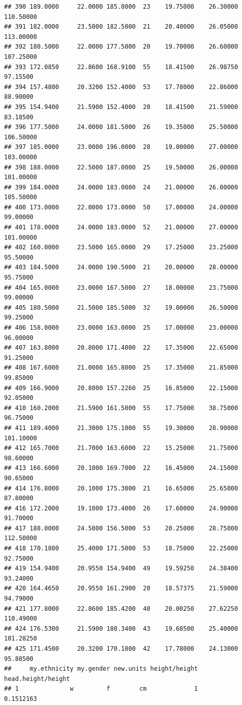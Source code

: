 \documentclass[]{article}
\begin{document}
\begin{verbatim}
## 390 189.0000     22.0000 185.8000  23    19.75000    26.30000 110.50000
## 391 182.0000     23.5000 182.5000  21    20.40000    26.05000 113.00000
## 392 180.5000     22.0000 177.5000  20    19.70000    26.60000 107.25000
## 393 172.0850     22.8600 168.9100  55    18.41500    26.98750  97.15500
## 394 157.4800     20.3200 152.4000  53    17.78000    22.86000  88.90000
## 395 154.9400     21.5900 152.4000  20    18.41500    21.59000  83.18500
## 396 177.5000     24.0000 181.5000  26    19.35000    25.50000 106.50000
## 397 185.0000     23.0000 196.0000  28    19.00000    27.00000 103.00000
## 398 188.0000     22.5000 187.0000  25    19.50000    26.00000 101.00000
## 399 184.0000     24.0000 183.0000  24    21.00000    26.00000 105.50000
## 400 173.0000     22.0000 173.0000  50    17.00000    24.00000  99.00000
## 401 178.0000     24.0000 183.0000  52    21.00000    27.00000 101.00000
## 402 160.0000     23.5000 165.0000  29    17.25000    23.25000  95.50000
## 403 184.5000     24.0000 190.5000  21    20.00000    28.00000  95.75000
## 404 165.0000     23.0000 167.5000  27    18.00000    23.75000  99.00000
## 405 180.5000     21.5000 185.5000  32    19.00000    26.50000  99.25000
## 406 158.0000     23.0000 163.0000  25    17.00000    23.00000  96.00000
## 407 163.8000     20.8000 171.4000  22    17.35000    22.65000  91.25000
## 408 167.6000     21.0000 165.8000  25    17.35000    21.85000  99.85000
## 409 166.9000     20.8000 157.2260  25    16.85000    22.15000  92.05000
## 410 160.2000     21.5900 161.5000  55    17.75000    38.75000  96.75000
## 411 189.4000     21.3000 175.1000  55    19.30000    28.90000 101.10000
## 412 165.7000     21.7000 163.6000  22    15.25000    21.75000  98.60000
## 413 166.6000     20.1000 169.7000  22    16.45000    24.15000  90.65000
## 414 176.8000     20.1000 175.3000  21    16.65000    25.65000  87.80000
## 416 172.2000     19.1000 173.4000  26    17.60000    24.90000  91.70000
## 417 188.0000     24.5000 156.5000  53    20.25000    28.75000 112.50000
## 418 170.1800     25.4000 171.5000  53    18.75000    22.25000  92.75000
## 419 154.9400     20.9550 154.9400  49    19.59250    24.38400  93.24000
## 420 164.4650     20.9550 161.2900  20    18.57375    21.59000  94.79000
## 421 177.8000     22.8600 185.4200  40    20.00250    27.62250 110.49000
## 424 176.5300     21.5900 180.3400  43    19.68500    25.40000 101.28250
## 425 171.4500     20.3200 170.1800  42    17.78000    24.13000  95.88500
##     my.ethnicity my.gender new.units height/height head.height/height
## 1              w         f        cm             1          0.1512163

\end{verbatim}
\end{document}
